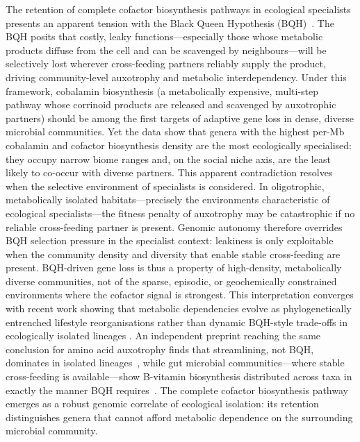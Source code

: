 \documentclass[times]{zHenriquesLab-StyleBioRxiv}
\begin{document}
The retention of complete cofactor biosynthesis pathways in ecological
specialists presents an apparent tension with the Black Queen Hypothesis
(BQH)~\cite{morris2012}. The BQH posits that costly, leaky functions---especially
those whose metabolic products diffuse from the cell and can be
scavenged by neighbours---will be selectively lost wherever cross-feeding
partners reliably supply the product, driving community-level auxotrophy and
metabolic interdependency. Under this framework, cobalamin biosynthesis (a
metabolically expensive, multi-step pathway whose corrinoid products are
released and scavenged by auxotrophic partners) should be among the first
targets of adaptive gene loss in dense, diverse microbial communities. Yet the
data show that genera with the highest per-Mb cobalamin and cofactor
biosynthesis density are the most ecologically specialised: they occupy narrow
biome ranges and, on the social niche axis, are the least likely to co-occur
with diverse partners. This apparent contradiction resolves when the selective
environment of specialists is considered. In oligotrophic, metabolically
isolated habitats---precisely the environments characteristic of ecological
specialists---the fitness penalty of auxotrophy may be catastrophic if no
reliable cross-feeding partner is present. Genomic autonomy therefore overrides
BQH selection pressure in the specialist context: leakiness is only exploitable
when the community density and diversity that enable stable cross-feeding are
present. BQH-driven gene loss is thus a property of high-density, metabolically
diverse communities, not of the sparse, episodic, or geochemically constrained
environments where the cofactor signal is strongest. This interpretation
converges with recent work showing that metabolic dependencies evolve as
phylogenetically entrenched lifestyle reorganisations rather than dynamic
BQH-style trade-offs in ecologically isolated lineages
\cite{hao2026,giovannoni2014,simonsen2021,henderson2026}. An independent
preprint reaching the same conclusion for amino acid auxotrophy finds that
streamlining, not BQH, dominates in isolated lineages~\cite{henderson2026},
while gut microbial communities---where stable cross-feeding is available---show
B-vitamin biosynthesis distributed across taxa in exactly the manner BQH
requires~\cite{soto2020,pacheco2026}. The complete cofactor biosynthesis
pathway emerges as a robust genomic correlate of ecological isolation: its
retention distinguishes genera that cannot afford metabolic dependence on the
surrounding microbial community.
\end{document}
